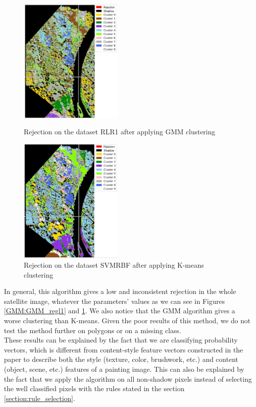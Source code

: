 \documentclass{siamart171218}
\begin{document}
\begin{figure}[H]
    \begin{minipage}[c]{.46\linewidth}
        \centering
        \includegraphics[width=5cm]{images/PETIT_Final_Rejet_peintures_GMM_Log_reg_l1_T0.50_Niter3.png}
        \caption{Rejection on the dataset RLR1 after applying GMM clustering}
        \label{GMM:GMM_regl1}
    \end{minipage}
    \hfill
    \begin{minipage}[c]{.46\linewidth}
        \centering
        \includegraphics[width=5cm]{images/PETIT_Final_Rejet_peintures_Kmeans_SVM_rbf_T0.50_Niter3.png}
        \caption{Rejection on the dataset SVMRBF after applying K-means clustering}
        \label{GMM:Kmeans_rbf}
    \end{minipage}
    \hfill
\end{figure}

In general, this algorithm gives a low and inconsistent rejection in the whole satellite image, whatever the parameters' values as we can see in Figures \ref{GMM:GMM_regl1} and \ref{GMM:Kmeans_rbf}. We also notice that the GMM algorithm gives a worse clustering than K-means. Given the poor results of this method, we do not test the method further on polygons or on a missing class.\\
These results can be explained by the fact that we are classifying probability vectors, which is different from content-style feature vectors constructed in the paper \cite {deng2019selective} to describe both the style (texture, color, brushwork, etc.) and content (object, scene, etc.) features of a painting image. This can also be explained by the fact that we apply the algorithm on all non-shadow pixels instead of selecting the well classified pixels with the rules stated in the section \ref{section:rule_selection}.
\end{document}

